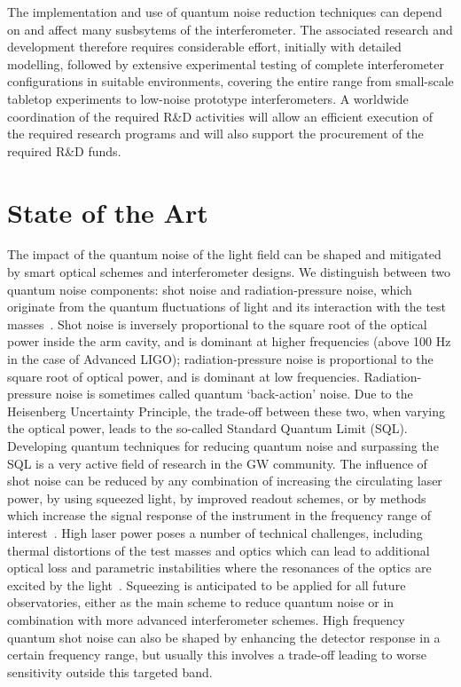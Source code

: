 The implementation and use of quantum noise reduction techniques can depend on and affect many susbsytems of the interferometer. The associated research and development therefore requires considerable effort, initially with detailed modelling, followed by extensive experimental testing of complete interferometer configurations in suitable environments, covering the entire range from small-scale tabletop experiments to low-noise prototype interferometers. A worldwide coordination of the required R\&D activities will allow an efficient execution of the required research programs and will also support the procurement of the required R\&D funds. 
 
\section{State of the Art}
The impact of the quantum noise of the light field can be shaped and mitigated by smart optical schemes and interferometer designs. We distinguish between two quantum noise components: shot noise and radiation-pressure noise, which originate from the quantum fluctuations of light and its interaction with the test masses~\cite{Cav1980}. Shot noise is inversely proportional to the square root of the optical power inside the arm cavity, and is dominant at higher frequencies (above 100 Hz in the case of Advanced LIGO); radiation-pressure noise is proportional to the square root of optical power, and is dominant at low frequencies. Radiation-pressure noise is sometimes called quantum `back-action' noise. Due to the Heisenberg Uncertainty Principle, the trade-off between these two, when varying the optical power, leads to the so-called Standard Quantum Limit (SQL). Developing quantum techniques for reducing quantum noise and surpassing the SQL is a very active field of research in the GW community. 
\pagebreak
The influence of shot noise can be reduced by any combination of increasing the circulating laser power, by using squeezed light, by improved readout schemes, or by methods which increase the signal response of the instrument in the frequency range of interest~\cite{StMe1991,Mizuno:RSE1993,Osamu:2006}. High laser power poses a number of technical challenges, including thermal distortions of the test masses and optics which can lead to additional optical loss and parametric instabilities where the resonances of the optics are excited by the light~\cite{BSV2001,Evans:2015raa}. Squeezing is anticipated to be applied for all future observatories, either as the main scheme to reduce quantum noise or in combination with more advanced interferometer schemes. High frequency quantum shot noise can also be shaped by enhancing the detector response in a certain frequency range, but usually this involves a trade-off leading to worse sensitivity outside this targeted band.  

